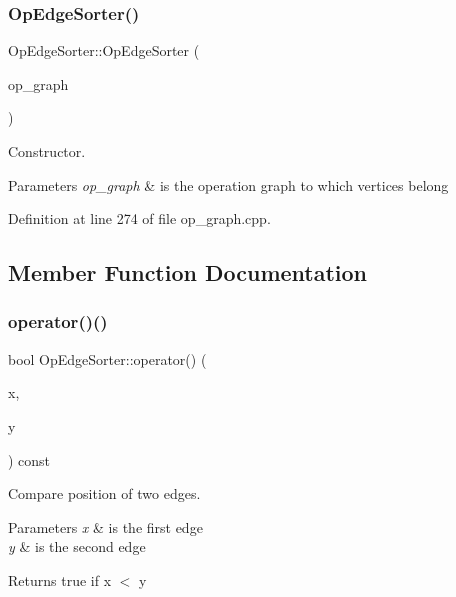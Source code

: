 \subsubsection{\texorpdfstring{Op\+Edge\+Sorter()}{OpEdgeSorter()}}
{\footnotesize\ttfamily Op\+Edge\+Sorter\+::\+Op\+Edge\+Sorter (\begin{DoxyParamCaption}\item[{const \hyperlink{op__graph_8hpp_a9a0b240622c47584bee6951a6f5de746}{Op\+Graph\+Const\+Ref}}]{op\+\_\+graph }\end{DoxyParamCaption})\hspace{0.3cm}{\ttfamily [explicit]}}



Constructor. 


\begin{DoxyParams}{Parameters}
{\em op\+\_\+graph} & is the operation graph to which vertices belong \\
\hline
\end{DoxyParams}


Definition at line 274 of file op\+\_\+graph.\+cpp.



\subsection{Member Function Documentation}
\mbox{\label{classOpEdgeSorter_a2f4d4bf609dbfabf6a3d3e689d8e1cd6}} 
\subsubsection{\texorpdfstring{operator()()}{operator()()}}
{\footnotesize\ttfamily bool Op\+Edge\+Sorter\+::operator() (\begin{DoxyParamCaption}\item[{const \hyperlink{graph_8hpp_a9eb9afea34e09f484b21f2efd263dd48}{Edge\+Descriptor}}]{x,  }\item[{const \hyperlink{graph_8hpp_a9eb9afea34e09f484b21f2efd263dd48}{Edge\+Descriptor}}]{y }\end{DoxyParamCaption}) const}



Compare position of two edges. 


\begin{DoxyParams}{Parameters}
{\em x} & is the first edge \\
\hline
{\em y} & is the second edge \\
\hline
\end{DoxyParams}
\begin{DoxyReturn}{Returns}
true if x $<$ y 
\end{DoxyReturn}


